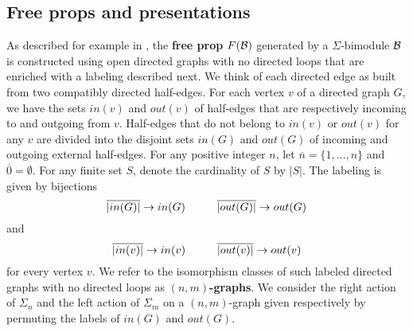 \subsection{Free props and presentations}	As described for example in \cite{fresse2010props}, the \textbf{free prop} $F(\mathcal{B})$ generated by a \mbox{$\Sigma$-bimodule} $\mathcal{B}$ is constructed using open directed graphs with no directed loops that are enriched with a labeling described next. We think of each directed edge as built from two compatibly directed half-edges. For each vertex $v$ of a directed graph $G$, we have the sets $in(v)$ and $out(v)$ of half-edges that are respectively incoming to and outgoing from $v$. Half-edges that do not belong to $in(v)$ or $out(v)$ for any $v$ are divided into the disjoint sets $in(G)$ and $out(G)$ of incoming and outgoing external half-edges. For any positive integer $n$, let $\overline{n} = \{1,\dots,n\}$ and $\overline{0} = \emptyset$. For any finite set $S$, denote the cardinality of $S$ by $|S|$. The labeling is given by bijections  
\begin{equation*}
\overline{|in(G)|}\to in(G)\hspace*{1cm}\overline{|out(G)|}\to out(G)
\end{equation*}
and
\begin{equation*}
\overline{|in(v)|}\to in(v)\hspace*{1cm}\overline{|out(v)|}\to out(v)
\end{equation*}
for every vertex $v$. We refer to the isomorphism classes of such labeled directed graphs with no directed loops as $(n,m)$\textbf{-graphs}. We consider the right action of $\Sigma_n$ and the left action of $\Sigma_m$ on a $(n,m)$-graph given respectively by permuting the labels of $in(G)$ and $out(G)$. 

